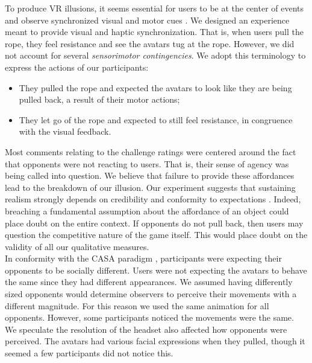 To produce VR illusions, it seems essential for users to be at the center of events and observe synchronized visual and motor cues \cite{slater2009inducing}. We designed an experience meant to provide visual and haptic synchronization. That is, when users pull the rope, they feel resistance and see the avatars tug at the rope. However, we did not account for several \textit{sensorimotor contingencies}. We adopt this terminology to express the actions of our participants: 
\begin{itemize}
\itemsep0em
\item They pulled the rope and expected the avatars to look like they are being pulled back, a result of their motor actions;
\item They let go of the rope and expected to still feel resistance, in congruence with the visual feedback.
\end{itemize}
Most comments relating to the challenge ratings were centered around the fact that opponents were not reacting to users. That is, their sense of agency was being called into question. We believe that failure to provide these affordances lead to the breakdown of our illusion. Our experiment suggests that sustaining realism strongly depends on credibility and conformity to expectations \cite{slater2009place}. Indeed, breaching a fundamental assumption about the affordance of an object could place doubt on the entire context. If opponents do not pull back, then users may question the competitive nature of the game itself. This would place doubt on the validity of all our qualitative measures.
\\
In conformity with the CASA paradigm \cite{nass1994computers}, participants were expecting their opponents to be socially different. Users were not expecting the avatars to behave the same since they had different appearances. We assumed having differently sized opponents would determine observers to perceive their movements with a different magnitude. For this reason we used the same animation for all opponents. However, some participants noticed the movements were the same. We speculate the resolution of the headset also affected how opponents were perceived. The avatars had various facial expressions when they pulled, though it seemed a few participants did not notice this.\\   
